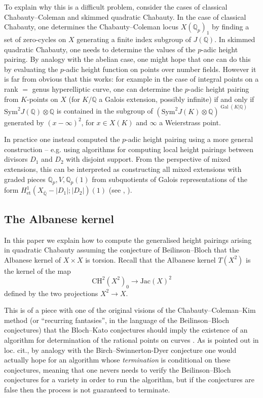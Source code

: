\documentclass[11pt]{amsart}
\def\Q{\mathbb Q}
\newcommand{\Sym}{\mathrm{Sym}}
\theoremstyle{plain}
\theoremstyle{definition}
\newcommand{\Jac}{\mathrm{Jac}}
\DeclareMathOperator{\Gal}{Gal}
\newcommand{\CH}{\mathrm{CH}}
\newcommand{\et}{\mathrm{et}}
\begin{document}
To explain why this is a difficult problem, consider the cases of classical Chabauty--Coleman and skimmed quadratic Chabauty. In the case of classical Chabauty, one determines the Chabauty--Coleman locus $X(\Q _p )_1$ by finding a set of zero-cycles on $X$ generating a finite index subgroup of $J(\Q )$. In skimmed quadratic Chabauty, one needs to determine the values of the $p$-adic height pairing. By analogy with the abelian case, one might hope that one can do this by evaluating the $p$-adic height function on points over number fields. However it is far from obvious that this works: for example in the case of integral points on a rank $=$ genus hyperelliptic curve, one can determine the $p$-adic height pairing from $K$-points on $X$ (for $K/\Q $ a Galois extension, possibly infinite) if and only if $\Sym ^2 J(\Q )\otimes \Q $ is contained in the subgroup of $(\Sym ^2 J(K)\otimes \Q )^{\Gal (K|\Q )}$ generated by $(x-\infty )^2 $, for $x\in X(K)$ and $\infty $ a Weierstrass point. 

In practice one instead computed the $p$-adic height pairing using a more general construction -- e.g. using algorithms for computing local height pairings between divisors $D_1 $ and $D_2$ with disjoint support. From the perspective of mixed extensions, this can be interpreted as constructing all mixed extensions with graded pieces $\Q _p ,V,\Q _p (1)$ from subquotients of Galois representations of the form $H^1 _{\et }(X_{\overline{\Q }}-|D_1 |;|D_2 |)(1)$ (see \cite{nekovar}, \cite{scholl}).

\subsection{The Albanese kernel}
In this paper we explain how to compute the generalised height pairings arising in quadratic Chabauty assuming the conjecture of Beilinson--Bloch that the Albanese kernel of $X\times X$ is torsion. Recall that the Albanese kernel $T(X^2 )$ is the kernel of the map
\[
\CH ^2 (X^2 )_0 \to \Jac (X)^2 
\]
defined by the two projections $X^2 \to X$.

This is of a piece with one of the original visions of the Chabauty--Coleman--Kim method (or ``recurring fantasies'', in the language of the Beilinson--Bloch conjectures) that the Bloch--Kato conjectures should imply the existence of an algorithm for determination of the rational points on curves \cite{kim:remarks}. As is pointed out in loc. cit., by analogy with the Birch--Swinnerton-Dyer conjecture one would actually hope for an algorithm whose \textit{termination} is conditional on these conjectures, meaning that one nevers needs to verify the Beilinson--Bloch conjectures for a variety in order to run the algorithm, but if the conjectures are false then the process is not guaranteed to terminate.
\end{document}
